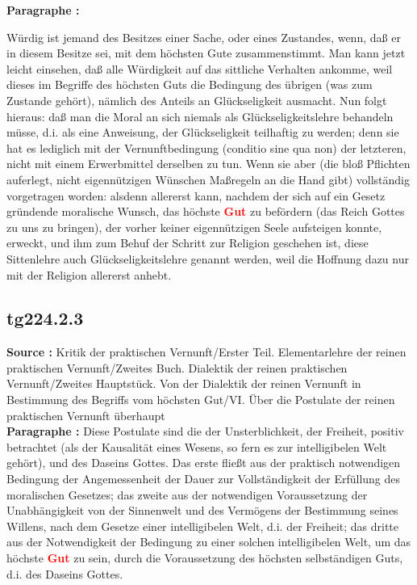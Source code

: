 \documentclass[a4paper,12pt,twoside]{book}
\newcommand{\match}[1]{\textcolor{red}{\textbf{#1}}}
\begin{document}
	\noindent\textbf{Paragraphe : }
	
	Würdig ist jemand des Besitzes einer Sache, oder eines Zustandes, wenn, daß er in diesem Besitze sei, mit dem höchsten Gute zusammenstimmt. Man kann jetzt leicht einsehen, daß alle Würdigkeit auf das sittliche Verhalten ankomme, weil dieses im Begriffe des höchsten Guts die Bedingung des übrigen (was zum Zustande gehört), nämlich des Anteils an Glückseligkeit ausmacht. Nun folgt hieraus: daß man die Moral an sich niemals als Glückseligkeitslehre behandeln müsse, d.i. als eine Anweisung, der Glückseligkeit teilhaftig zu werden; denn sie hat es lediglich mit der Vernunftbedingung (conditio sine qua non) der letzteren, nicht mit einem Erwerbmittel derselben zu tun. Wenn sie aber (die bloß Pflichten auferlegt, nicht eigennützigen Wünschen Maßregeln an die Hand gibt) vollständig vorgetragen worden: alsdenn allererst kann, nachdem der sich auf ein Gesetz gründende moralische Wunsch, das höchste \match{Gut} zu befördern (das Reich Gottes zu uns zu bringen), der vorher keiner eigennützigen Seele aufsteigen konnte, erweckt, und ihm zum Behuf der Schritt zur Religion geschehen ist, diese Sittenlehre auch Glückseligkeitslehre genannt werden, weil die Hoffnung dazu nur mit der Religion allererst anhebt. 
	
	\subsection*{tg224.2.3} 
	\textbf{Source : }Kritik der praktischen Vernunft/Erster Teil. Elementarlehre der reinen praktischen Vernunft/Zweites Buch. Dialektik der reinen praktischen Vernunft/Zweites Hauptstück. Von der Dialektik der reinen Vernunft in Bestimmung des Begriffs vom höchsten Gut/VI. Über die Postulate der reinen praktischen Vernunft überhaupt\\  
	
	\noindent\textbf{Paragraphe : }Diese Postulate sind die der Unsterblichkeit, der Freiheit, positiv betrachtet (als der Kausalität eines Wesens, so fern es zur intelligibelen Welt gehört), und des Daseins Gottes. Das erste fließt aus der praktisch notwendigen Bedingung der Angemessenheit der Dauer zur Vollständigkeit der Erfüllung des moralischen Gesetzes; das zweite aus der notwendigen Voraussetzung der Unabhängigkeit von der Sinnenwelt und des Vermögens der Bestimmung seines Willens, nach dem Gesetze einer intelligibelen Welt, d.i. der Freiheit; das dritte aus der Notwendigkeit der Bedingung zu einer solchen intelligibelen Welt, um das höchste \match{Gut} zu sein, durch die Voraussetzung des höchsten selbständigen Guts, d.i. des Daseins Gottes. 
	
\end{document}
